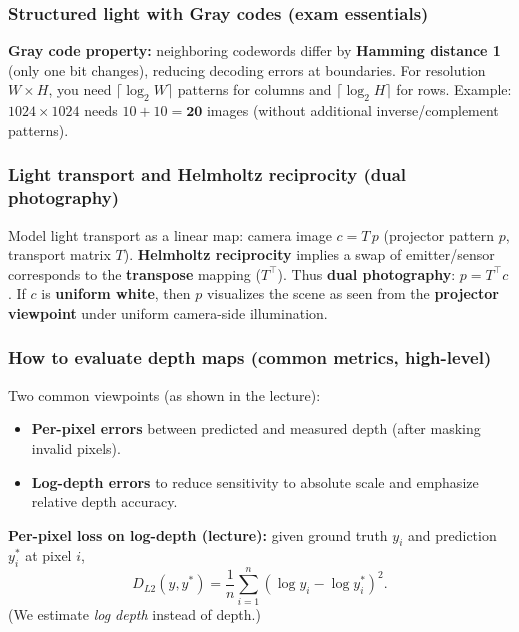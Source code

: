 \documentclass[11pt,a4paper]{article}
\begin{document}
\subsubsection{Structured light with Gray codes (exam essentials)}
\begin{notebox}
\textbf{Gray code property:} neighboring codewords differ by \textbf{Hamming distance 1} (only one bit changes), reducing decoding errors at boundaries.
For resolution $W\times H$, you need $\lceil\log_2 W\rceil$ patterns for columns and $\lceil\log_2 H\rceil$ for rows.
Example: $1024\times1024$ needs $10+10=\textbf{20}$ images (without additional inverse/complement patterns).
\end{notebox}

\subsubsection{Light transport and Helmholtz reciprocity (dual photography)}
\begin{notebox}
Model light transport as a linear map: camera image $c = T\,p$ (projector pattern $p$, transport matrix $T$).
\textbf{Helmholtz reciprocity} implies a swap of emitter/sensor corresponds to the \textbf{transpose} mapping ($T^\top$).
Thus \textbf{dual photography}: $p = T^\top c$.
If $c$ is \textbf{uniform white}, then $p$ visualizes the scene as seen from the \textbf{projector viewpoint} under uniform camera-side illumination.
\end{notebox}

\subsubsection{How to evaluate depth maps (common metrics, high-level)}
Two common viewpoints (as shown in the lecture):
\begin{itemize}
  \item \textbf{Per-pixel errors} between predicted and measured depth (after masking invalid pixels).
  \item \textbf{Log-depth errors} to reduce sensitivity to absolute scale and emphasize relative depth accuracy.
\end{itemize}

\begin{mathrule}
\textbf{Per-pixel loss on log-depth (lecture):}\quad
given ground truth $y_i$ and prediction $y_i^\ast$ at pixel $i$,
\[
D_{L2}(y,y^\ast) = \frac{1}{n}\sum_{i=1}^{n}\left(\log y_i - \log y_i^\ast\right)^2.
\]
(We estimate \emph{log depth} instead of depth.)
\end{mathrule}
\end{document}
